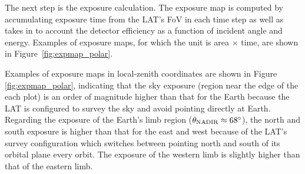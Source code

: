 The next step is the exposure calculation.
The exposure map is computed 
by accumulating exposure time from the LAT's FoV
in each time step as well as takes
in to account the detector efficiency as a function
of incident angle and energy.
Examples of exposure maps, for which the unit is area $\times$ time,
are shown in Figure~\ref{fig:expmap_polar}.



Examples of exposure maps in local-zenith coordinates are
shown in Figure \ref{fig:expmap_polar}, indicating that the sky exposure
(region near the edge of the each plot) is an order of
magnitude higher than that for the Earth because the LAT
is configured to survey the sky and avoid pointing directly at Earth.
Regarding the exposure of the Earth's limb region
($\theta_{\rm NADIR}\approx68^\circ$), the north and south exposure
is higher than that for the east and west because of the LAT's survey
configuration which switches between pointing north and south of
its orbital plane every orbit. The exposure of the western limb
is slightly higher than that of the eastern limb.

